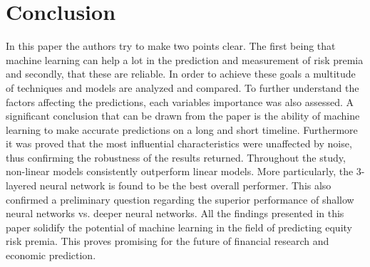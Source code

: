 \section{Conclusion}

In this paper the authors try to make two points clear. The first being that machine learning can help a lot in the prediction and measurement of risk premia 
and secondly, that these are reliable.
In order to achieve these goals a multitude of techniques and models are analyzed and compared. To further understand the factors affecting the predictions, each variables importance was also assessed.
A significant conclusion that can be drawn from the paper is the ability of machine learning to make accurate predictions on a long and short timeline.
Furthermore it was proved that the most influential characteristics were unaffected by noise, thus confirming the
robustness of the results returned.
Throughout the study, non-linear models consistently outperform linear models. More particularly, the 3-layered neural network is found to be the best overall performer. This also confirmed a preliminary question regarding the superior performance of shallow neural networks vs. deeper neural networks.
\newline\noindent
All the findings presented in this paper solidify the potential of machine learning in the field of predicting equity risk premia. This proves promising for the future of financial research and economic prediction.